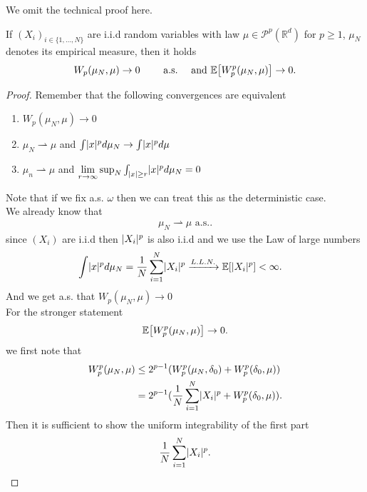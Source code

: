 We omit the technical proof here.
\begin{prop}\label{wasserstein_convergence_arb}
	If $(X_i)_{i \in \{1,\ldots ,N\}  }$  are i.i.d random variables with law $\mu\in \mathcal{P}^p(\mathbb{R}^{d} )$ for $p\geq 1$, $\mu_N$ denotes its empirical measure, then it holds
	\begin{align*} 
	W_p(\mu_N,\mu ) \to  0 \qquad \text{ a.s.}
	\quad \mbox{ and }
	\mathbb{E}\big[W_p^{p}(\mu_N,\mu ) \big] \to 0
	.\end{align*}
\end{prop}
\begin{proof}
	Remember that the following convergences are equivalent 
	\begin{enumerate}
		\item $W_p(\mu_N,\mu ) \to 0$
		\item $\mu_N \rightharpoonup \mu $ and $\int \lvert x\rvert^{p} d\mu_N \to \int \lvert x\rvert^{p} d\mu   $
		\item $\mu_n \rightharpoonup \mu $ and $\lim_{r\to \infty} \sup_N \int_{\abs{x} \ge r} \abs{x}^p d\mu_N = 0$
	\end{enumerate}
	Note that if we fix a.s. $\omega $ then we can treat this as the deterministic case. \\[1ex]
	We already know that 
	\begin{align*}
	\mu_N \rightharpoonup \mu \text{ a.s.}
	.\end{align*}
	since $(X_i)$ are i.i.d then $\lvert X_i\rvert^{p} $ is also i.i.d  and we use the Law of large numbers
	\begin{align*}
	\int \lvert x\rvert^{p} d\mu_N   &= \frac{1}{N}\sum_{i=1}^{N} \lvert X_i\rvert^{p}  \xrightarrow{L.L.N.} \mathbb{E}[\lvert X_i\rvert^{p} ] < \infty
	.\end{align*} 
	And we get a.s. that $W_p(\mu_N,\mu ) \to  0$\\[1ex]
	For the stronger statement 
	\begin{align*}
	\mathbb{E}\big[W_p^{p}(\mu_N,\mu ) \big] \to  0
	.\end{align*}
	we first note that  
	\begin{align*}
	W_p^{p}(\mu_N,\mu )  &\le  2^{p-1} (W^{p}_p(\mu_N,\delta_0)  + W_p^{p}(\delta_0,\mu )) \\
	&= 2^{p-1} (\frac{1}{N} \sum_{i=1}^{N}   \lvert X_i\rvert^{p}  + W_p^{p}(\delta_0,\mu ))
	.\end{align*}
	Then it is sufficient to show the uniform integrability of the first part 
	\begin{align*}
	\frac{1}{N}\sum_{i=1}^{N} \lvert X_i\rvert^{p}  
	.\end{align*}

\end{proof}
